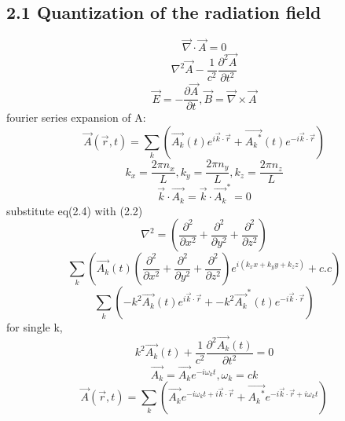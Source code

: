 \documentclass[9pt]{article}
\begin{document}
\subsection{2.1 Quantization of the radiation field}
\begin{equation}
    \vec{\nabla}\cdot\vec{A}=0
\end{equation}
\begin{equation}
    \nabla^2\vec{A}-\frac{1}{c^2}\frac{\partial^2\vec{A}}{\partial t^2}
\end{equation}
\begin{equation}
    \vec{E} = -\frac{\partial \vec{A}}{\partial t}, \vec{B}=\vec{\nabla}\times\vec{A}
\end{equation}
fourier series expansion of A:
\begin{equation}
    \vec{A}(\vec{r},t)=\sum_k(\vec{A_k}(t)e^{i\vec{k}\cdot\vec{r}}+\vec{{A_k}^*}(t)e^{-i\vec{k}\cdot\vec{r}})
\end{equation}
\begin{equation}
    k_x=\frac{2\pi n_x}{L},k_y=\frac{2\pi n_y}{L},k_z=\frac{2\pi n_z}{L}
\end{equation}
\begin{equation}
    \vec{k}\cdot\vec{A_k}=\vec{k}\cdot\vec{A_k}^*=0
\end{equation}
substitute eq(2.4) with (2.2)
\begin{equation*}
    \nabla^2=(\frac{\partial^2}{\partial x^2}+\frac{\partial^2}{\partial y^2}+\frac{\partial^2}{\partial z^2})
\end{equation*}
\begin{equation*}
    \sum_k(\vec{A_k}(t)(\frac{\partial^2}{\partial x^2}+\frac{\partial^2}{\partial y^2}+\frac{\partial^2}{\partial z^2})
    e^{i(k_x x + k_y y + k_z z)} + c.c)
\end{equation*}
\begin{equation*}
    \sum_k(-k^2\vec{A_k}(t)e^{i\vec{k}\cdot\vec{r}} + -k^2\vec{A_k}^*(t)e^{-i\vec{k}\cdot\vec{r}})
\end{equation*}
for single k, 
\begin{equation}
    k^2\vec{A_k}(t)+\frac{1}{c^2}\frac{\partial^2 \vec{A_k}(t)}{\partial t^2}=0
\end{equation}
\begin{equation}
    \vec{A_k}=\vec{A_k}e^{-i{\omega}_k t} , {\omega}_k = ck
\end{equation}
\begin{equation}
    \vec{A}(\vec{r},t)=\sum_k(\vec{A_k}e^{-i\omega_k t + i\vec{k}\cdot\vec{r}}+
    \vec{{A_k}^*}e^{-i\vec{k}\cdot\vec{r} + i\omega_k t})
\end{equation}
\end{document}
